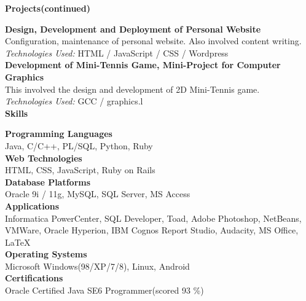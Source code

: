 \documentclass[a4paper,12pt,final]{memoir}
\newcommand{\Sep}{\vspace{1.5em}}
\newcommand{\SmallSep}{\vspace{0.5em}}
\newcommand{\CVSection}[1]
	{\Large\textbf{#1}\par
	\SmallSep\normalsize\normalfont}
\newcommand{\CVItem}[1]
	{\textbf{\color{Plum} #1}}
\begin{document}

\normalsize\normalfont

\CVSection{Projects(continued)}
\CVItem{Design, Development and Deployment of Personal Website}\\
{\footnotesize Configuration, maintenance of personal website. Also involved content writing.\\\emph{Technologies Used:} HTML / JavaScript / CSS / Wordpress}%
\SmallSep\\
\CVItem{Development of Mini-Tennis Game, Mini-Project for Computer Graphics}\\
{\footnotesize This involved the design and development of 2D Mini-Tennis game.\\ \emph{Technologies Used:} GCC / graphics.l}\\%
 
\CVSection{Skills}
\CVItem{Programming Languages}\\
{\footnotesize Java, C/C++, PL/SQL, Python, Ruby}
\SmallSep\\
\CVItem{Web Technologies}\\
{\footnotesize HTML, CSS, JavaScript, Ruby on Rails}
\SmallSep\\
\CVItem{Database Platforms}\\
{\footnotesize Oracle 9i / 11g, MySQL, SQL Server, MS Access}
\SmallSep\\
\CVItem{Applications}\\
{\footnotesize Informatica PowerCenter, SQL Developer, Toad, Adobe Photoshop, NetBeans, VMWare, Oracle Hyperion, IBM Cognos Report Studio, Audacity, MS Office, \LaTeX}
\SmallSep\\
\CVItem{Operating Systems}\\
{\footnotesize Microsoft Windows(98/XP/7/8), Linux, Android}
\SmallSep\\
\CVItem{Certifications}\\
{\footnotesize Oracle Certified Java SE6 Programmer(scored 93 \%)}
\Sep
\end{document}
